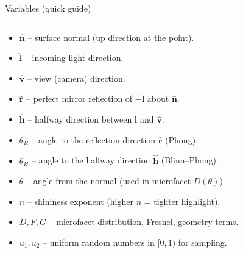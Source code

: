 \documentclass[aspectratio=169]{beamer}
\newcommand{\nvec}{\hat{\mathbf{n}}}
\newcommand{\lvec}{\hat{\mathbf{l}}}
\newcommand{\vvec}{\hat{\mathbf{v}}}
\newcommand{\rvec}{\hat{\mathbf{r}}}
\newcommand{\hvec}{\hat{\mathbf{h}}}
\let\olditem\item
\renewcommand{\item}{\olditem \vspace{2pt}}
\begin{document}
\begin{frame}{Variables (quick guide)}
\begin{columns}
\begin{column}{0.62\textwidth}
\begin{itemize}
  \item $\nvec$ – surface normal (up direction at the point).
  \item $\lvec$ – incoming light direction.
  \item $\vvec$ – view (camera) direction.
  \item $\rvec$ – perfect mirror reflection of $-\lvec$ about $\nvec$.
  \item $\hvec$ – halfway direction between $\lvec$ and $\vvec$.
  \item $\theta_R$ – angle to the reflection direction $\rvec$ (Phong).
  \item $\theta_H$ – angle to the halfway direction $\hvec$ (Blinn–Phong).
  \item $\theta$ – angle from the normal (used in microfacet $D(\theta)$).
  \item $n$ – shininess exponent (higher $n$ = tighter highlight).
  \item $D,F,G$ – microfacet distribution, Fresnel, geometry terms.
  \item $u_1,u_2$ – uniform random numbers in $[0,1)$ for sampling.
\end{itemize}
\end{column}
\begin{column}{0.38\textwidth}
\end{column}
\end{columns}
\end{frame}
\end{document}
